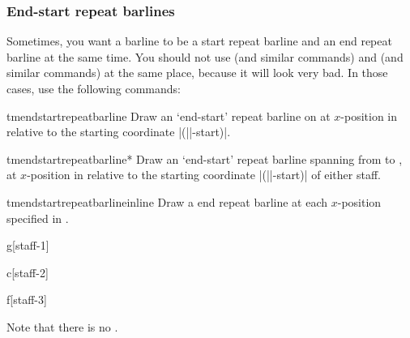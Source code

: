 \documentclass[11pt,a4paper]{ltxdoc}
\begin{document}
\subsubsection{End-start repeat barlines}\label{sec:multistaff:barlines:endstart}
Sometimes, you want a barline to be a start repeat barline and an end repeat 
barline at the same time. You should not use  (and 
similar commands) and  (and similar commands) at the 
same place, because it will look very bad. In those cases, use the following 
commands:
\begin{docCommand}{tmendstartrepeatbarline}{}
  Draw an `end-start' repeat barline on  at $x$-position 
   in relative to the starting coordinate |(||-start)|.
\end{docCommand}
\begin{docCommand}{tmendstartrepeatbarline*}{}
  Draw an `end-start' repeat barline spanning from  to 
  , at $x$-position  in relative to 
  the starting coordinate |(||-start)| of either staff.
\end{docCommand}
\begin{docCommand}{tmendstartrepeatbarlineinline}{}
  Draw a end repeat barline at each $x$-position specified in .
\end{docCommand}
\begin{dispExample}
\begin{tmmultiplestaves}[0pt]%
  \begin{tmstaff}{g}[staff-1]
  \end{tmstaff}%
  \begin{tmstaff}{c}[staff-2]
  \end{tmstaff}%
  \begin{tmstaff}{f}[staff-3]
  \end{tmstaff}%
\end{tmmultiplestaves}
\end{dispExample}
\begin{caution}
  Note that there is no .
\end{caution}
\end{document}

